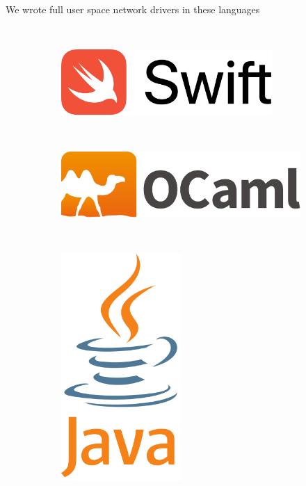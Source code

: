 \documentclass[NET,english,aspectratio=169,notitleframe]{tumbeamer}
\begin{document}
\begin{frame}{We wrote full user space network drivers in these languages}
\begin{figure}
    \centering
    \begin{subfigure}[t]{0.12\textwidth}
        \centering
    \end{subfigure}
    ~ 
    \begin{subfigure}[t]{0.20\textwidth}
        \centering
        \includegraphics[width=0.88\textwidth]{pics/swift}
    \end{subfigure}
    ~ 
    \begin{subfigure}[t]{0.18\textwidth}
        \centering
        \includegraphics[width=1.\textwidth]{pics/ocaml}
	\vspace{0.2cm}
    \end{subfigure}
    ~
    \begin{subfigure}[t]{0.15\textwidth}
        \centering
        \includegraphics[width=0.50\textwidth]{pics/java}

\end{subfigure}
\end{figure}
\end{frame}
\end{document}
